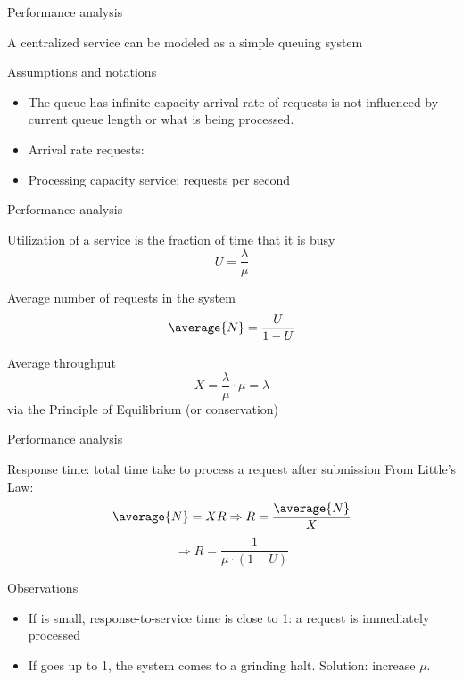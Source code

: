  \begin{slide}{Performance analysis}
    \begin{block}{A centralized service can be modeled as a simple queuing system}
      \centering{}
    \end{block}
    \begin{block}{Assumptions and notations}
      \begin{itemize}\tightlist
      \item The queue has infinite capacity \mathexpr{\Rightarrow} arrival rate of requests is not influenced
        by current queue length or what is being processed.
      \item Arrival rate requests: \mathexpr{\lambda}
      \item Processing capacity service: \mathexpr{\mu} requests per second
      \end{itemize}
    \end{block}
  \end{slide}
  \begin{slide}{Performance analysis}
    \begin{block}{Utilization  of a service is the fraction of time that it is busy}
      \[ U = \frac{\lambda}{\mu} \]
    \end{block}
    \begin{block}{Average number of requests in the system}
      \[ \average{N} = \frac{U}{1-U} \]
    \end{block}
    \begin{block}{Average throughput}
      \[ X = \frac{\lambda}{\mu} \cdot \mu = \lambda \]
      via the Principle of Equilibrium (or conservation)
    \end{block}
  \end{slide}
  \begin{slide}{Performance analysis}
    \begin{block}{Response time: total time take to process a request after submission}
      From Little's Law:
      \[ \average{N} = XR \Rightarrow R = \frac{\average{N}}{X}\]
      \[ \Rightarrow R = \frac{1}{\mu\cdot(1-U)} \]
    \end{block}
    \begin{block}{Observations}
      \begin{itemize}
      \item If  is small, response-to-service time is close to 1: a request is immediately
        processed
      \item If  goes up to 1, the system comes to a grinding halt. \newline Solution: increase $\mu$.
      \end{itemize}
    \end{block}
  \end{slide}
